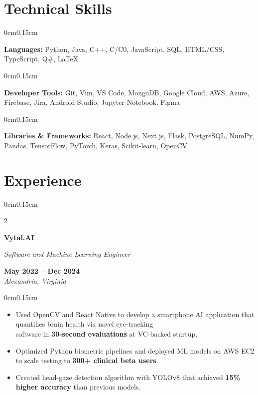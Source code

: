 \documentclass[10pt, letterpaper]{article}
\newenvironment{highlights}{
    \begin{itemize}[topsep=0pt, parsep=0pt, partopsep=0pt, itemsep=0pt, leftmargin=0.6cm]
}{
    \end{itemize}
}
\newenvironment{onecolentry}{
    \begin{adjustwidth}{0cm}{0.15cm}
}{
    \end{adjustwidth}
}
\newenvironment{twocolentry}[2][]{
    \onecolentry
    \def\secondColumn{#2}
    \setcolumnwidth{\fill, 4cm}
    \begin{paracol}{2}
}{
    \switchcolumn \raggedleft \secondColumn
    \end{paracol}
    \endonecolentry
}
\begin{document}
    \vspace{0.05cm}

    \section{Technical Skills}
    \vspace{0.1cm}

    \begin{onecolentry}
        \textbf{Languages:} Python, Java, C++, C/C0, JavaScript, SQL, HTML/CSS, TypeScript, Q\#, LaTeX
    \end{onecolentry}
    \vspace{-0.1cm}
    \begin{onecolentry}
        \textbf{Developer Tools:} Git, Vim, VS Code, MongoDB, Google Cloud, AWS, Azure, Firebase, Jira, Android Studio, Jupyter Notebook, Figma
    \end{onecolentry}
    \vspace{-0.1cm}
    \begin{onecolentry}
        \textbf{Libraries \& Frameworks:} React, Node.js, Next.js, Flask, PostgreSQL, NumPy, Pandas, TensorFlow, PyTorch, Keras, Scikit-learn, OpenCV
    \end{onecolentry}

    \vspace{0.05cm}

    \section{Experience}
    \vspace{0.1cm}

    \begin{twocolentry}{\textbf{May 2022 -- Dec 2024} \\ \textit{Alexandria, Virginia}}
        \textbf{Vytal.AI}
        
        \textit{Software and Machine Learning Engineer}
    \end{twocolentry}
    \vspace{-0.1cm}
    \begin{onecolentry}
        \begin{highlights}
            \item Used OpenCV and React Native to develop a smartphone AI application that quantifies brain health via novel eye-tracking \\ software in \textbf{30-second evaluations} at VC-backed startup.
            \item Optimized Python biometric pipelines and deployed ML models on AWS EC2 to scale testing to \textbf{300+ clinical beta users}.
            \item Created head-gaze detection algorithm with YOLOv8 that achieved \textbf{15\% higher accuracy} than previous models.
        \end{highlights}
    \end{onecolentry}
\end{document}
